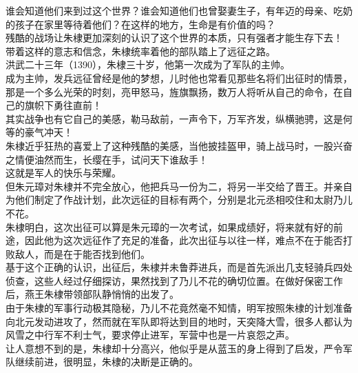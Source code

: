 \begin{multicols}{\theparacolNo}
谁会知道他们来到过这个世界？谁会知道他们也曾娶妻生子，有年迈的母亲、吃奶的孩子在家里等待着他们？在这样的地方，生命是有价值的吗？\\

残酷的战场让朱棣更加深刻的认识了这个世界的本质，只有强者才能生存下去！\\

带着这样的意志和信念，朱棣统率着他的部队踏上了远征之路。\\

洪武二十三年（1390），朱棣三十岁，他第一次成为了军队的主帅。\\

成为主帅，发兵远征曾经是他的梦想，儿时他也常看见那些名将们出征时的情景，那是一个多么光荣的时刻，亮甲怒马，旌旗飘扬，数万人将听从自己的命令，在自己的旗帜下勇往直前！\\

其实战争也有它自己的美感，勒马敌前，一声令下，万军齐发，纵横驰骋，这是何等的豪气冲天！\\

朱棣近乎狂热的喜爱上了这种残酷的美感，当他披挂盔甲，骑上战马时，一股兴奋之情便油然而生，长缨在手，试问天下谁敌手！\\

这就是军人的快乐与荣耀。\\

但朱元璋对朱棣并不完全放心，他把兵马一份为二，将另一半交给了晋王。并亲自为他们制定了作战计划，此次远征的目标有两个，分别是北元丞相咬住和太尉乃儿不花。\\

朱棣明白，这次出征可以算是朱元璋的一次考试，如果成绩好，将来就有好的前途，因此他为这次远征作了充足的准备，此次出征与以往一样，难点不在于能否打败敌人，而是在于能否找到他们。\\

基于这个正确的认识，出征后，朱棣并未鲁莽进兵，而是首先派出几支轻骑兵四处侦查，这些人经过仔细探访，果然找到了乃儿不花的确切位置。在做好保密工作后，燕王朱棣带领部队静悄悄的出发了。\\

由于朱棣的军事行动极其隐秘，乃儿不花竟然毫不知情，明军按照朱棣的计划准备向北元发动进攻了，然而就在军队即将达到目的地时，天突降大雪，很多人都认为风雪之中行军不利士气，要求停止进军，军营中也是一片哀怨之声。\\

让人意想不到的是，朱棣却十分高兴，他似乎是从蓝玉的身上得到了启发，严令军队继续前进，很明显，朱棣的决断是正确的。\\


\end{multicols}
